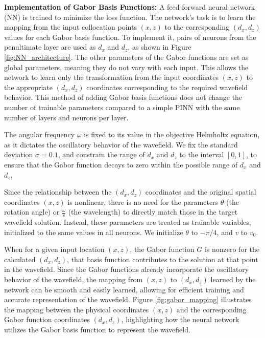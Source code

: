 \documentclass[authoryear, preprint, 12pt]{elsarticle}
\begin{document}
	\textbf{Implementation of Gabor Basis Functions: }A feed-forward neural network (NN) is trained to minimize the loss function.  The network’s task is to learn the mapping from the input collocation points \( (x, z) \)  to the corresponding \( (d_x, d_z) \) values for each Gabor basis function. To implement it, pairs of neurons from the penultimate layer are used as \( d_x \) and \( d_z \), as shown in Figure \ref{fig:NN_architecture}. The other parameters of the Gabor functions are set as global parameters, meaning they do not vary with each input. This allows the network to learn only the transformation from the input coordinates \( (x, z) \) to the appropriate \( (d_x, d_z) \) coordinates corresponding to the required wavefield behavior. This method of adding Gabor basis functions does not change the number of trainable parameters compared to a simple PINN with the same number of layers and neurons per layer.
	
	The angular frequency \( \omega \) is fixed to its value in the objective Helmholtz equation, as it dictates the oscillatory behavior of the wavefield. We fix the standard deviation \( \sigma = 0.1 \), and constrain the range of \( d_x \) and \( d_z \) to the interval \( [0, 1] \), to ensure that the Gabor function decays to zero within the possible range of \( d_x \) and \( d_z \).
	
	Since the relationship between the \(( d_x, d_z) \) coordinates and the original spatial coordinates \( (x, z) \) is nonlinear, there is no need for the parameters \( \theta \) (the rotation angle) or \( \frac{\omega}{v} \) (the wavelength) to directly match those in the target wavefield solution. Instead, these parameters are treated as trainable variables, initialized to the same values in all neurons. We initialize $\theta$ to $-\pi/4$, and $v$ to $v_0$. 
	
	When for a given input location \( (x, z) \), the Gabor function \( G \) is nonzero for the calculated \(( d_x, d_z) \), that basis function contributes to the solution at that point in the wavefield. Since the Gabor functions already incorporate the oscillatory behavior of the wavefield, the mapping from \( (x, z) \) to \( (d_x, d_z )\) learned by the network can be smooth and easily learned, allowing for efficient training and accurate representation of the wavefield. Figure \ref{fig:gabor_mapping} illustrates the mapping between the physical coordinates \( (x, z) \) and the corresponding Gabor function coordinates \( (d_x, d_z) \), highlighting how the neural network utilizes the Gabor basis function to represent the wavefield.
	
\end{document}
